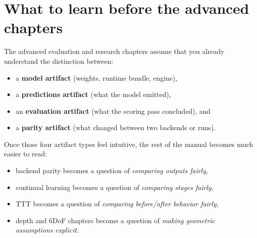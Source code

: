 \section{What to learn before the advanced chapters}
The advanced evaluation and research chapters assume that you already understand
the distinction between:
\begin{itemize}
  \item a \textbf{model artifact} (weights, runtime bundle, engine),
  \item a \textbf{predictions artifact} (what the model emitted),
  \item an \textbf{evaluation artifact} (what the scoring pass concluded), and
  \item a \textbf{parity artifact} (what changed between two backends or runs).
\end{itemize}

Once those four artifact types feel intuitive, the rest of the manual becomes
much easier to read:
\begin{itemize}
  \item backend parity becomes a question of \emph{comparing outputs fairly},
  \item continual learning becomes a question of \emph{comparing stages fairly},
  \item TTT becomes a question of \emph{comparing before/after behavior fairly},
  \item depth and 6DoF chapters become a question of \emph{making geometric assumptions explicit}.
\end{itemize}

